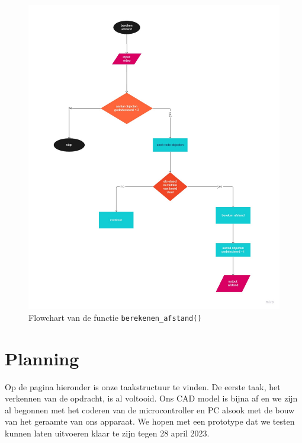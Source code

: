 \documentclass[kulak]{kulakarticle} %
\begin{document}
\begin{figure} [!h]
	\centering
	\includegraphics[width = 0.8 \textwidth]{flowchart afstand berekenen.pdf}
\cprotect\caption{Flowchart van de functie \verb*|berekenen_afstand()|}
\end{figure}
 


\section{Planning}
Op de pagina hieronder is onze taakstructuur te vinden. De eerste taak, het verkennen van de opdracht, is al voltooid. Ons CAD model is bijna af en we zijn al begonnen met het coderen van de microcontroller en PC alsook met de bouw van het geraamte van ons apparaat. We hopen met een prototype dat we testen kunnen laten uitvoeren klaar te zijn tegen 28 april 2023.

\end{document}
